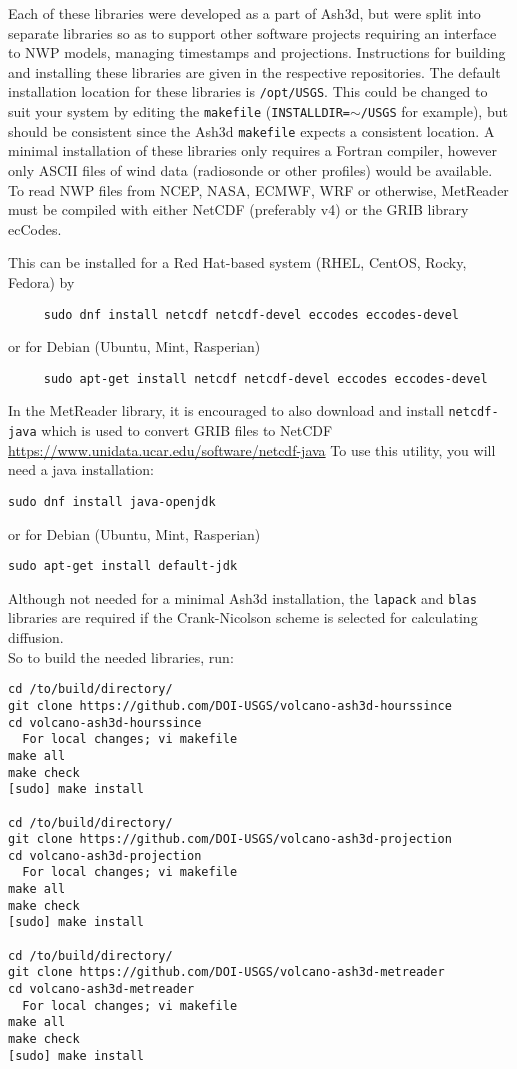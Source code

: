 Each of these libraries were developed as a part of Ash3d, but were split into
separate libraries so as to support other software projects requiring an
interface to NWP models, managing timestamps and projections.
Instructions for building and installing these
libraries are given in the respective repositories. The default installation
location for these libraries is \texttt{/opt/USGS}. This could be changed to suit
your system by editing the \texttt{makefile}
(\texttt{INSTALLDIR=}$\sim$\texttt{/USGS} for example),
but should be consistent since the Ash3d \texttt{makefile} expects
a consistent location. A minimal installation of these libraries only requires
a Fortran compiler, however only ASCII files of wind data (radiosonde or other profiles)
would be available. To read NWP files from NCEP, NASA, ECMWF, WRF or otherwise, 
MetReader must be compiled with either NetCDF (preferably v4) or the GRIB
library ecCodes.

This can be installed for a Red Hat-based system (RHEL, CentOS, Rocky, Fedora) by
\begin{verbatim}
     sudo dnf install netcdf netcdf-devel eccodes eccodes-devel
\end{verbatim}
or for Debian (Ubuntu, Mint, Rasperian)
\begin{verbatim}
     sudo apt-get install netcdf netcdf-devel eccodes eccodes-devel
\end{verbatim}

In the MetReader library, it is encouraged to also download and install 
\texttt{netcdf-java} which is used to convert GRIB files to NetCDF
\url{https://www.unidata.ucar.edu/software/netcdf-java}
To use this utility, you will need a java installation:
\begin{verbatim}
sudo dnf install java-openjdk
\end{verbatim}
or for Debian (Ubuntu, Mint, Rasperian)
\begin{verbatim}
sudo apt-get install default-jdk
\end{verbatim}

Although not needed for a minimal Ash3d installation, the \texttt{lapack} and \texttt{blas}
libraries are required if the Crank-Nicolson scheme is selected for calculating
diffusion.\\

So to build the needed libraries, run:
\begin{verbatim}
cd /to/build/directory/
git clone https://github.com/DOI-USGS/volcano-ash3d-hourssince
cd volcano-ash3d-hourssince
  For local changes; vi makefile
make all
make check
[sudo] make install

cd /to/build/directory/
git clone https://github.com/DOI-USGS/volcano-ash3d-projection
cd volcano-ash3d-projection
  For local changes; vi makefile
make all
make check
[sudo] make install

cd /to/build/directory/
git clone https://github.com/DOI-USGS/volcano-ash3d-metreader
cd volcano-ash3d-metreader
  For local changes; vi makefile
make all
make check
[sudo] make install
\end{verbatim}

